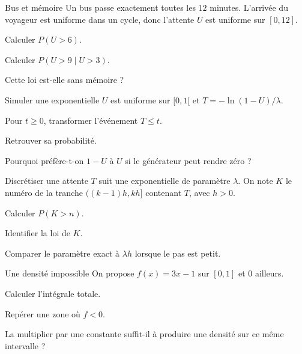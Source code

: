 \begingroup\renewcommand{\otBesoinPlace}[1]{}\begin{minipage}{\linewidth}
\begin{exercice}[3]{Bus et mémoire}
Un bus passe exactement toutes les $12$ minutes. L’arrivée du voyageur est uniforme dans un cycle, donc l’attente $U$ est uniforme sur $[0,12]$.
\begin{questions}
\item Calculer $P(U>6)$.
\item Calculer $P(U>9\mid U>3)$.
\item Cette loi est-elle sans mémoire ?
\end{questions}
\end{exercice}
\begin{exercice}[3]{Simuler une exponentielle}
$U$ est uniforme sur $[0,1[$ et $T=-\ln(1-U)/\lambda$.
\begin{questions}
\item Pour $t\geq0$, transformer l’événement $T\leq t$.
\item Retrouver sa probabilité.
\item Pourquoi préfère-t-on $1-U$ à $U$ si le générateur peut rendre zéro ?
\end{questions}
\end{exercice}
\begin{exercice}[3]{Discrétiser une attente}
$T$ suit une exponentielle de paramètre $\lambda$. On note $K$ le numéro de la tranche $((k-1)h,kh]$ contenant $T$, avec $h>0$.
\begin{questions}
\item Calculer $P(K>n)$.
\item Identifier la loi de $K$.
\item Comparer le paramètre exact à $\lambda h$ lorsque le pas est petit.
\end{questions}
\end{exercice}
\begin{exercice}[3]{Une densité impossible}
On propose $f(x)=3x-1$ sur $[0,1]$ et $0$ ailleurs.
\begin{questions}
\item Calculer l’intégrale totale.
\item Repérer une zone où $f<0$.
\item La multiplier par une constante suffit-il à produire une densité sur ce même intervalle ?
\end{questions}
\end{exercice}
\end{minipage}\endgroup
